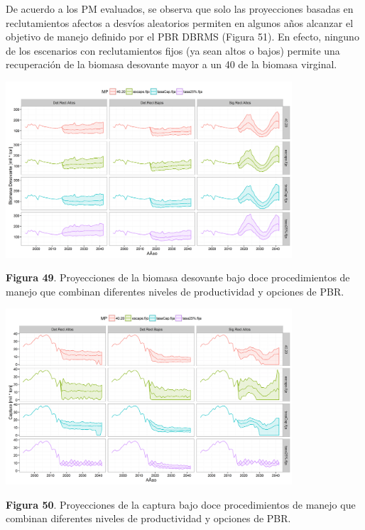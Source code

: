 \documentclass[
  spanish,
]{article}
\begin{document}
De acuerdo a los PM evaluados, se observa que solo las proyecciones
basadas en reclutamientos afectos a desvíos aleatorios permiten en
algunos años alcanzar el objetivo de manejo definido por el PBR DBRMS
(Figura 51). En efecto, ninguno de los escenarios con reclutamientos
fijos (ya sean altos o bajos) permite una recuperación de la biomasa
desovante mayor a un 40 de la biomasa virginal.

\begin{center}
\includegraphics[width=0.8\textwidth]{Figuras/Figura_49.png}
\end{center}

\small \textbf{Figura 49}. Proyecciones de la biomasa desovante bajo
doce procedimientos de manejo que combinan diferentes niveles de
productividad y opciones de PBR. \vspace{0.5cm} \normalsize

\begin{center}
\includegraphics[width=0.8\textwidth]{Figuras/Figura_50.png}
\end{center}

\small \textbf{Figura 50}. Proyecciones de la captura bajo doce
procedimientos de manejo que combinan diferentes niveles de
productividad y opciones de PBR. \vspace{0.5cm} \normalsize
\end{document}
